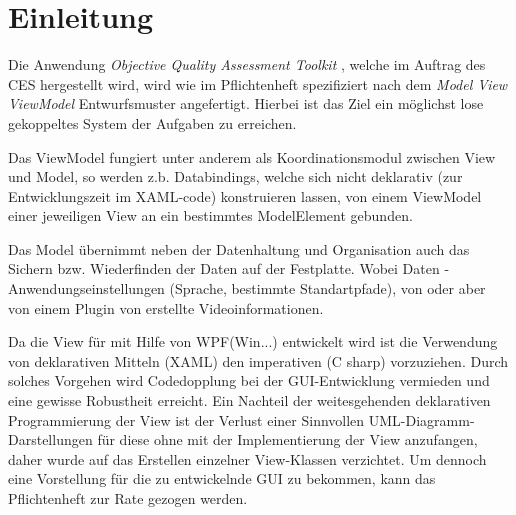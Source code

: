 \chapter{Einleitung}

Die Anwendung \emph{Objective Quality Assessment Toolkit} , welche im Auftrag des CES hergestellt wird, wird wie im Pflichtenheft spezifiziert nach dem \emph{Model View ViewModel} Entwurfsmuster angefertigt.
Hierbei ist das Ziel ein möglichst lose gekoppeltes System der Aufgaben zu erreichen.

Das ViewModel fungiert unter anderem als Koordinationsmodul
zwischen View und Model, so werden z.b. Databindings, welche
sich nicht deklarativ (zur Entwicklungszeit im XAML-code)
konstruieren lassen, von einem ViewModel einer jeweiligen View
an ein bestimmtes ModelElement gebunden.

Das Model übernimmt neben der Datenhaltung und Organisation
auch das Sichern bzw. Wiederfinden der Daten auf der Festplatte.
Wobei Daten \projektTitel-Anwendungseinstellungen (Sprache, bestimmte
Standartpfade), von \projektTitel oder
aber von einem Plugin von \projektTitel erstellte Videoinformationen.

Da die View für \projektTitel mit Hilfe von WPF(Win...) entwickelt 
wird ist die Verwendung von deklarativen Mitteln (XAML) den
imperativen (C sharp) vorzuziehen. Durch solches Vorgehen wird
Codedopplung bei der GUI-Entwicklung vermieden und eine
gewisse Robustheit erreicht. Ein Nachteil der weitesgehenden deklarativen
Programmierung der View ist der Verlust einer Sinnvollen
UML-Diagramm-Darstellungen für diese ohne mit der Implementierung 
der View anzufangen, daher wurde auf das Erstellen einzelner View-Klassen
verzichtet. Um dennoch eine Vorstellung für die zu entwickelnde GUI 
zu bekommen, kann das Pflichtenheft zur Rate gezogen werden.
